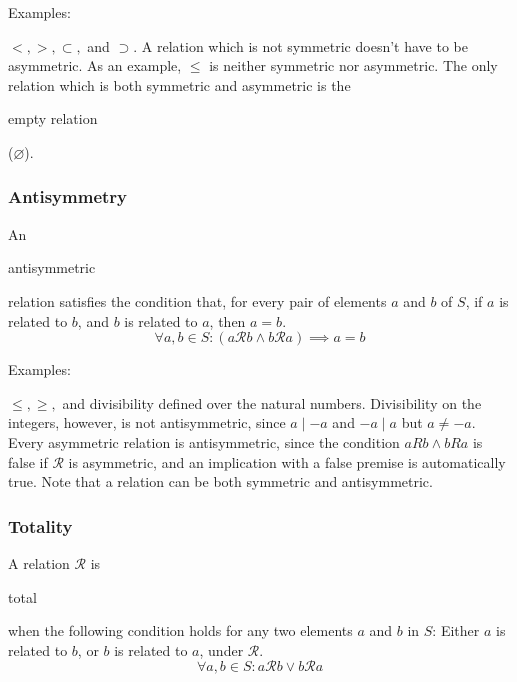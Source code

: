 \documentclass[11pt]{article}
\theoremstyle{plain}
\theoremstyle{definition}
\begin{document}
\noindent \begin{em}Examples:\end{em} $ <, >, \subset, $ and $ \supset $. A relation which is not symmetric doesn't have to be asymmetric. As an example, $ \le $ is neither symmetric nor asymmetric. The only relation which is both symmetric and asymmetric is the \begin{em}empty relation\end{em} ($ \varnothing $).

\subsubsection*{ Antisymmetry}
An \begin{em}antisymmetric\end{em} relation satisfies the condition that, for every pair of elements $ a $ and $ b $ of $ S $, if $ a $ is related to $ b $, and $ b $ is related to $ a $, then $ a = b $.
\begin{displaymath}
  \forall a, b \in S : (a\mathcal{R}b \wedge b\mathcal{R}a) \implies a = b
\end{displaymath}

\noindent \begin{em}Examples:\end{em} $ \le, \ge, $ and divisibility defined over the natural numbers. Divisibility on the integers, however, is not antisymmetric, since $a \mid -a$ and $-a \mid a$ but $a \ne -a.$ Every asymmetric relation is antisymmetric, since the condition $ aRb \wedge bRa $ is false if $ \mathcal{R} $ is asymmetric, and an implication with a false premise is automatically true.
Note that a relation can be both symmetric and antisymmetric.

\subsubsection*{ Totality}
A relation $ \mathcal{R} $ is \begin{em}total\end{em} when the following condition holds for any two elements $ a $ and $ b $ in $ S $: Either $ a $ is related to $ b $, or $ b $ is related to $ a $, under $ \mathcal{R} $. %
\begin{displaymath}
	\forall a, b \in S : a\mathcal{R}b \vee b\mathcal{R}a
\end{displaymath}
\end{document}
